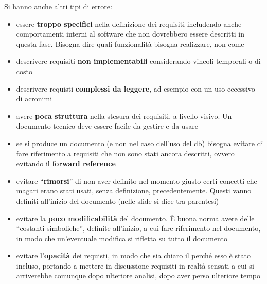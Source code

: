 \documentclass[a4paper,12pt, oneside]{book}
\begin{document}
Si hanno anche altri tipi di errore:
\begin{itemize}
  \item essere \textbf{troppo specifici} nella definizione dei requisiti
  includendo anche comportamenti interni al software che non dovrebbero essere
  descritti in questa fase. Bisogna dire quali funzionalità bisogna realizzare,
  non come
  \item descrivere requisiti \textbf{non implementabili} considerando vincoli
  temporali o di costo
  \item descrivere requisti \textbf{complessi da leggere}, ad esempio con un uso
  eccessivo di acronimi
  \item avere \textbf{poca struttura} nella stesura dei requisiti, a livello
  visivo. Un documento tecnico deve essere facile da gestire e da usare
  \item se si produce un documento (e non nel caso dell'uso del db) bisogna
  evitare di fare riferimento a requisiti che non sono stati ancora descritti,
  ovvero evitando il \textbf{forward reference}
  \item evitare ``\textbf{rimorsi}'' di non aver definito nel momento giusto
  certi concetti che magari erano stati usati, senza definizione,
  precedentemente. Questi vanno definiti all'inizio del documento (nelle slide
  si dice tra parentesi)
  \item evitare la \textbf{poco modificabilità} del documento. È buona norma
  avere delle ``costanti simboliche'', definite all'inizio, a cui fare
  riferimento nel documento, in modo che un'eventuale modifica si rifletta su
  tutto il documento
  \item evitare l'\textbf{opacità} dei requisti, in modo che sia
  chiaro il perché esso è stato incluso, portando a mettere in discussione
  requisiti in realtà sensati a cui si arriverebbe comunque dopo ulteriore
  analisi, dopo aver perso ulteriore tempo
  
\end{itemize}
\end{document}

